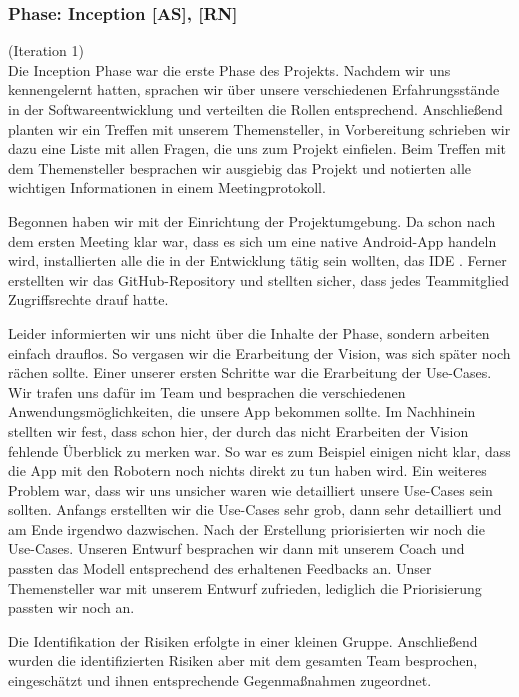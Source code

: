 \documentclass[10pt]{article}
\begin{document}
\subsubsection{Phase: Inception [AS], [RN]}
(Iteration 1) \\
Die Inception Phase war die erste Phase des Projekts. Nachdem wir uns kennengelernt hatten, sprachen wir über
unsere verschiedenen Erfahrungsstände in der Softwareentwicklung und verteilten die Rollen entsprechend.
Anschließend planten wir ein Treffen
mit unserem Themensteller, in Vorbereitung schrieben wir dazu eine Liste mit allen Fragen, die uns zum Projekt einfielen.
Beim Treffen mit dem Themensteller besprachen wir ausgiebig das Projekt und notierten alle wichtigen Informationen
in einem Meetingprotokoll.\par
\medskip
Begonnen haben wir mit der Einrichtung der Projektumgebung. Da schon nach dem ersten Meeting klar war, dass es sich
um eine native Android-App handeln wird, installierten alle die in der Entwicklung tätig sein wollten, das IDE
. Ferner erstellten wir das GitHub-Repository und stellten sicher, dass jedes Teammitglied
Zugriffsrechte drauf hatte.\par
\medskip
Leider informierten wir uns nicht über die Inhalte der Phase, sondern arbeiten einfach drauflos.
So vergasen wir die Erarbeitung der Vision, was sich später noch rächen sollte.
Einer unserer ersten Schritte war die Erarbeitung der Use-Cases.
Wir trafen uns dafür im Team und besprachen die verschiedenen Anwendungsmöglichkeiten,
die unsere App bekommen sollte. Im Nachhinein stellten wir fest, dass schon hier, der durch das nicht
Erarbeiten der Vision fehlende Überblick zu merken war. So war es zum Beispiel einigen nicht klar, dass die
App mit den Robotern noch nichts direkt zu tun haben wird. Ein weiteres Problem war, dass wir uns unsicher waren
wie detailliert unsere Use-Cases sein sollten. Anfangs erstellten wir die Use-Cases sehr grob, dann sehr detailliert
und am Ende irgendwo dazwischen. Nach der Erstellung priorisierten wir noch die Use-Cases. Unseren Entwurf besprachen
wir dann mit unserem Coach und passten das Modell entsprechend des erhaltenen Feedbacks an. Unser
Themensteller war mit unserem Entwurf zufrieden, lediglich die Priorisierung passten wir noch an.\par
\medskip
Die Identifikation der Risiken erfolgte in einer kleinen Gruppe. Anschließend wurden die identifizierten Risiken aber
mit dem gesamten Team besprochen, eingeschätzt und ihnen entsprechende Gegenmaßnahmen zugeordnet.
\end{document}

